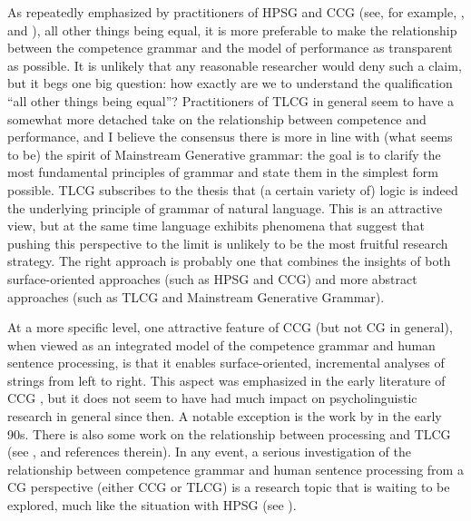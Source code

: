 \documentclass[output=paper
                ,modfonts
 	        ,biblatex
                ,babelshorthands
                ,newtxmath
                ,draftmode
                ,colorlinks, citecolor=brown
]{langscibook}
\begin{document}
As repeatedly emphasized by practitioners of HPSG and CCG (see, for
example, \citealt{SW2011a}, \citealt[Section~13.7]{steedman2012} and
), all other things being equal, it is more
preferable to make the relationship between the competence grammar and
the model of performance as transparent as possible. It is
unlikely that any reasonable
researcher would deny such a claim, but it begs one big question:
how exactly are we to understand the qualification ``all other things
being equal''? Practitioners of TLCG in general seem to have a somewhat more
detached take on the relationship between competence and performance, 
and I believe the consensus there is more in line with (what seems to be)
the spirit of Mainstream Generative grammar: the goal is to clarify
the most fundamental principles of grammar and state them in the
simplest form possible. TLCG subscribes to the thesis that (a certain
variety of) logic is indeed the underlying principle of grammar of
natural language. This is an attractive view, but at the same time
language exhibits phenomena that suggest that pushing this perspective
to the limit is unlikely to be the most fruitful research strategy. The
right approach is probably one that combines the insights of both 
surface-oriented approaches (such as HPSG and CCG) and more abstract
approaches (such as TLCG and Mainstream Generative Grammar).

At a more specific level, one attractive feature of CCG (but not CG in
general), when viewed as an integrated model of the competence grammar
and human sentence processing, is that it enables surface-oriented,
incremental analyses of strings from left to right. This aspect was
emphasized in the early literature of CCG \citep{AS82a,CS85a}, but it
does not seem to have had much impact on psycholinguistic research in
general since then. A notable exception is the work by
\citet{pickering-barry91,PB93a} in the early 90s. There is also some work
on the relationship between processing and TLCG (see \citealt[Chapters 9 and 10]{morrill2011},
and references therein). In any event, a serious
investigation of the relationship between competence grammar and human
sentence processing from a CG perspective (either CCG or TLCG) is a
research topic that is waiting to be explored, much like the situation
with HPSG (see ).
\end{document}

